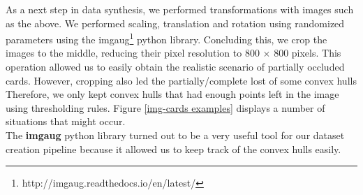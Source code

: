 \documentclass[a4paper]{article}
\begin{document}
\newline \newline\newline 
\noindent As a next step in data synthesis, we performed transformations with images such as the above. We performed scaling, translation and rotation using randomized parameters using the imgaug\footnote{http://imgaug.readthedocs.io/en/latest/} python library.  Concluding this, we crop the images to the middle, reducing their pixel resolution to 800 $\times$ 800 pixels. This operation allowed us to easily obtain the realistic scenario of partially occluded cards. However, cropping also led the partially/complete lost of some convex hulls Therefore, we only kept  convex hulls that had enough points left in the image using thresholding rules.  
Figure \ref{img-cards examples} displays a number of situations that might occur. \\
The \textbf{imgaug} python library turned out to be a very useful tool for our dataset creation pipeline because it allowed us to keep track of the convex hulls easily.
\end{document}
